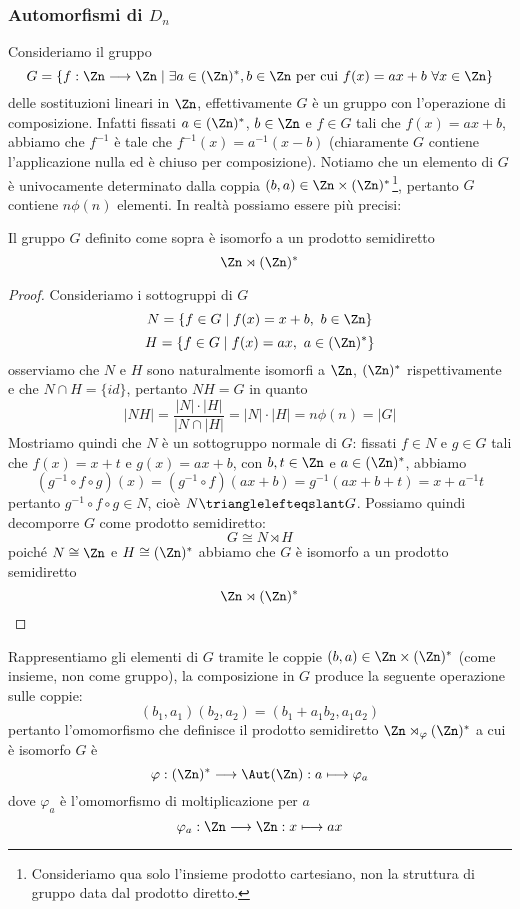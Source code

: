 \documentclass[11pt]{scrartcl}
\begin{document}
\subsubsection{Automorfismi di $D_n$}

Consideriamo il gruppo 
\[
    G = \{f: \Zn\longrightarrow\Zn\mid \exists a \in (\Zn)^*, b \in \Zn\text{ per cui }
    f(x) = ax + b~\forall x \in \Zn\}
\]
delle sostituzioni lineari in $\Zn$, effettivamente $G$ è un gruppo con 
l'operazione di composizione. Infatti fissati $a \in (\Zn)^*$, $b \in \Zn$ e
$f \in G$ tali che $f(x) = ax + b$, abbiamo che $f^{-1}$ è tale che 
$f^{-1}(x) = a^{-1}(x - b)$ (chiaramente $G$ contiene l'applicazione nulla 
ed è chiuso per composizione). Notiamo che un elemento di $G$ è univocamente
determinato dalla coppia $(b, a) \in \Zn \times (\Zn)^*$\footnote{
    Consideriamo qua solo l'insieme prodotto cartesiano, non la struttura di 
    gruppo data dal prodotto diretto.
}, pertanto $G$
contiene $n\phi(n)$ elementi. In realtà possiamo essere più precisi:

\begin{proposition}
    Il gruppo $G$ definito come sopra è isomorfo a un prodotto semidiretto 
    \[
        \Zn \rtimes (\Zn)^*
    \]
\end{proposition}

\begin{proof}
    Consideriamo i sottogruppi di $G$
    \[
        N = \{f \in G\mid f(x) = x + b,~b \in \Zn\}
    \]
    \[
        H = \{f \in G\mid f(x) = ax,~a \in (\Zn)^*\}
    \]
    osserviamo che $N$ e $H$ sono naturalmente isomorfi a $\Zn$, $(\Zn)^*$ 
    rispettivamente e che $N \cap H = \{id\}$, pertanto $NH = G$ in quanto 
    \[
        |NH| = \frac{|N|\cdot|H|}{|N\cap|H|} = |N|\cdot|H| = n\phi(n) = |G|
    \]
    Mostriamo quindi che $N$ è un sottogruppo normale di $G$: fissati $f \in N$
    e $g \in G$ tali che $f(x) = x + t$ e $g(x) = ax + b$, con $b, t \in \Zn$ e 
    $a \in (\Zn)^*$, abbiamo
    \[
        (g^{-1}\circ f \circ g)(x) = (g^{-1}\circ f)(ax + b) = g^{-1}(ax + b + t) = 
        x + a^{-1}t
    \]
        pertanto $g^{-1}\circ f\circ g \in N$, cioè $N\trianglelefteqslant G$.
    Possiamo quindi decomporre $G$ come prodotto semidiretto:
    \[
        G \cong N\rtimes H
    \]
    poiché $N \cong \Zn$ e $H \cong (\Zn)^*$ abbiamo che $G$ è isomorfo a un
    prodotto semidiretto 
    \[
        \Zn \rtimes (\Zn)^*
    \]
\end{proof}

Rappresentiamo gli elementi di $G$ tramite le coppie $(b, a) \in \Zn\times (\Zn)^*$
(come insieme, non come gruppo),
la composizione in $G$ produce la seguente operazione sulle coppie:
\[
    (b_1, a_1)(b_2, a_2) = (b_1 + a_1b_2, a_1a_2)
\]
pertanto l'omomorfismo che definisce il prodotto semidiretto $\Zn \rtimes_{\varphi}(\Zn)^*$
a cui è isomorfo $G$ è 
\[
    \varphi: (\Zn)^* \longrightarrow \Aut(\Zn): a \longmapsto \varphi_a
\]
dove $\varphi_a$ è l'omomorfismo di moltiplicazione per $a$
\[
    \varphi_a :\Zn \longrightarrow \Zn: x \longmapsto ax
\]
\end{document}
